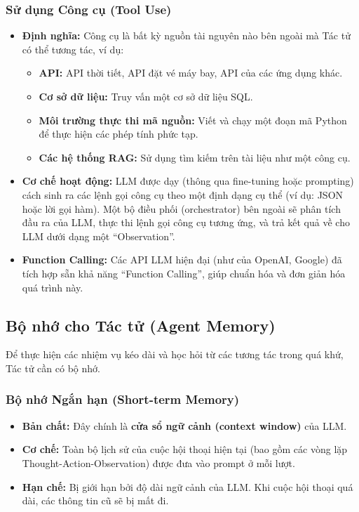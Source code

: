 \subsubsection{Sử dụng Công cụ (Tool Use)}
\begin{itemize}
    \item \textbf{Định nghĩa:} Công cụ là bất kỳ nguồn tài nguyên nào bên ngoài mà Tác tử có thể tương tác, ví dụ:
        \begin{itemize}
            \item \textbf{API:} API thời tiết, API đặt vé máy bay, API của các ứng dụng khác.
            \item \textbf{Cơ sở dữ liệu:} Truy vấn một cơ sở dữ liệu SQL.
            \item \textbf{Môi trường thực thi mã nguồn:} Viết và chạy một đoạn mã Python để thực hiện các phép tính phức tạp.
            \item \textbf{Các hệ thống RAG:} Sử dụng tìm kiếm trên tài liệu như một công cụ.
        \end{itemize}
    \item \textbf{Cơ chế hoạt động:} LLM được dạy (thông qua fine-tuning hoặc prompting) cách sinh ra các lệnh gọi công cụ theo một định dạng cụ thể (ví dụ: JSON hoặc lời gọi hàm). Một bộ điều phối (orchestrator) bên ngoài sẽ phân tích đầu ra của LLM, thực thi lệnh gọi công cụ tương ứng, và trả kết quả về cho LLM dưới dạng một “Observation”.
    \item \textbf{Function Calling:} Các API LLM hiện đại (như của OpenAI, Google) đã tích hợp sẵn khả năng “Function Calling”, giúp chuẩn hóa và đơn giản hóa quá trình này.
\end{itemize}

\subsection{Bộ nhớ cho Tác tử (Agent Memory)}
\label{ssec:agent_memory}
Để thực hiện các nhiệm vụ kéo dài và học hỏi từ các tương tác trong quá khứ, Tác tử cần có bộ nhớ.

\subsubsection{Bộ nhớ Ngắn hạn (Short-term Memory)}
\begin{itemize}
    \item \textbf{Bản chất:} Đây chính là \textbf{cửa sổ ngữ cảnh (context window)} của LLM.
    \item \textbf{Cơ chế:} Toàn bộ lịch sử của cuộc hội thoại hiện tại (bao gồm các vòng lặp Thought-Action-Observation) được đưa vào prompt ở mỗi lượt.
    \item \textbf{Hạn chế:} Bị giới hạn bởi độ dài ngữ cảnh của LLM. Khi cuộc hội thoại quá dài, các thông tin cũ sẽ bị mất đi.
\end{itemize}

